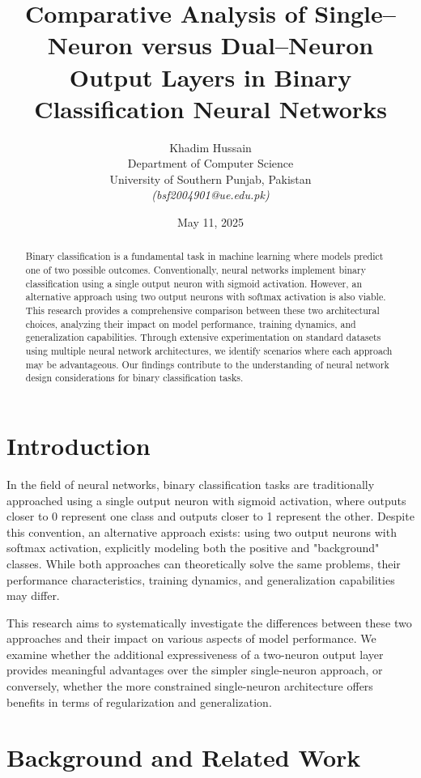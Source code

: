\documentclass[11pt]{article}
\title{Comparative Analysis of Single--Neuron versus Dual--Neuron Output Layers in Binary Classification Neural Networks}
\author{Khadim Hussain\\Department of Computer Science \\ University of Southern Punjab, Pakistan\\[1ex]\textit{(bsf2004901@ue.edu.pk)}}
\date{May 11, 2025}
\begin{document}
\maketitle

\begin{abstract}
Binary classification is a fundamental task in machine learning where models predict one of two possible outcomes. Conventionally, neural networks implement binary classification using a single output neuron with sigmoid activation. However, an alternative approach using two output neurons with softmax activation is also viable. This research provides a comprehensive comparison between these two architectural choices, analyzing their impact on model performance, training dynamics, and generalization capabilities. Through extensive experimentation on standard datasets using multiple neural network architectures, we identify scenarios where each approach may be advantageous. Our findings contribute to the understanding of neural network design considerations for binary classification tasks.
\end{abstract}

\section{Introduction}
In the field of neural networks, binary classification tasks are traditionally approached using a single output neuron with sigmoid activation, where outputs closer to 0 represent one class and outputs closer to 1 represent the other. Despite this convention, an alternative approach exists: using two output neurons with softmax activation, explicitly modeling both the positive and "background" classes. While both approaches can theoretically solve the same problems, their performance characteristics, training dynamics, and generalization capabilities may differ.

This research aims to systematically investigate the differences between these two approaches and their impact on various aspects of model performance. We examine whether the additional expressiveness of a two-neuron output layer provides meaningful advantages over the simpler single-neuron approach, or conversely, whether the more constrained single-neuron architecture offers benefits in terms of regularization and generalization.

\section{Background and Related Work}
\end{document}
